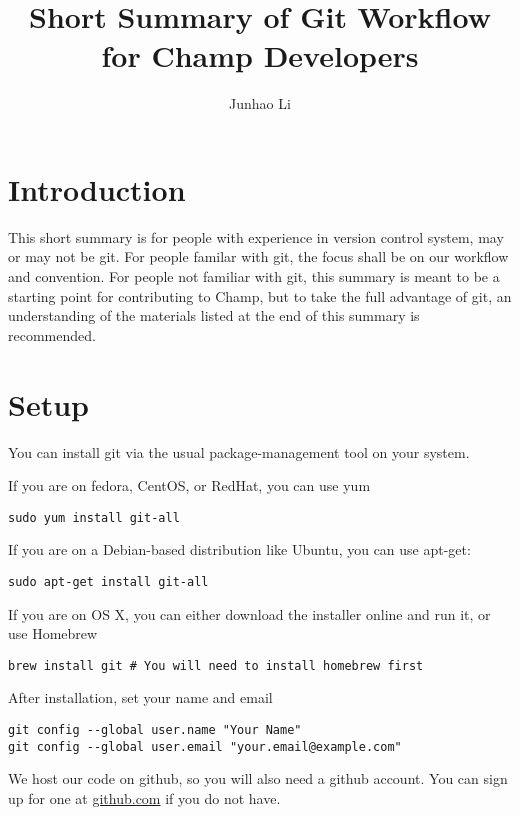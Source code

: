 \documentclass[runningheads,letterpaper]{llncs}
\begin{document}
\mainmatter
\title{Short Summary of Git Workflow for Champ Developers}

\author{Junhao Li}

\maketitle

\section*{Introduction}

This short summary is for people with experience in version control system, may or may not be git.
For people familar with git, the focus shall be on our workflow and convention.
For people not familiar with git, this summary is meant to be a starting point for contributing to Champ, but to take the full advantage of git, an understanding of the materials listed at the end of this summary is recommended.

\section{Setup}

You can install git via the usual package-management tool on your system.

If you are on fedora, CentOS, or RedHat, you can use yum
\begin{verbatim}
sudo yum install git-all
\end{verbatim}
If you are on a Debian-based distribution like Ubuntu, you can use apt-get:
\begin{verbatim}
sudo apt-get install git-all
\end{verbatim}
If you are on OS X, you can either download the installer online and run it, or use Homebrew
\begin{verbatim}
brew install git # You will need to install homebrew first
\end{verbatim}

After installation, set your name and email
\begin{verbatim}
git config --global user.name "Your Name"
git config --global user.email "your.email@example.com"
\end{verbatim}

We host our code on github, so you will also need a github account.
You can sign up for one at \url{github.com} if you do not have.
\end{document}
